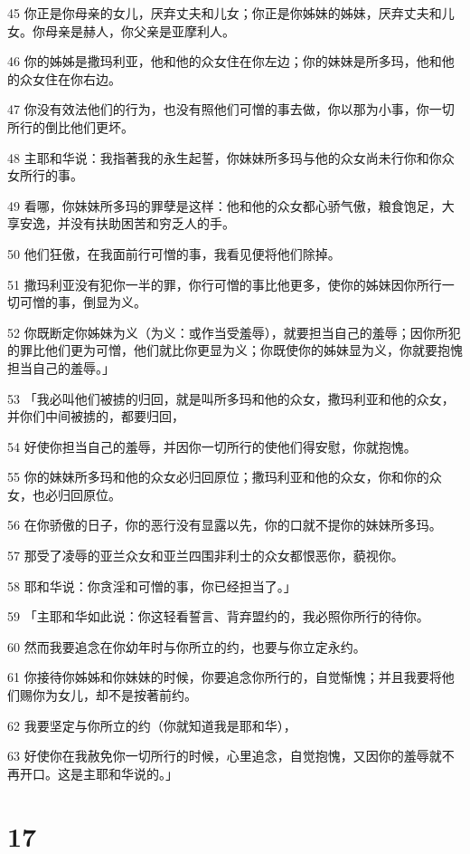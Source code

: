 \par 45 你正是你母亲的女儿，厌弃丈夫和儿女；你正是你姊妹的姊妹，厌弃丈夫和儿女。你母亲是赫人，你父亲是亚摩利人。
\par 46 你的姊姊是撒玛利亚，他和他的众女住在你左边；你的妹妹是所多玛，他和他的众女住在你右边。
\par 47 你没有效法他们的行为，也没有照他们可憎的事去做，你以那为小事，你一切所行的倒比他们更坏。
\par 48 主耶和华说：我指著我的永生起誓，你妹妹所多玛与他的众女尚未行你和你众女所行的事。
\par 49 看哪，你妹妹所多玛的罪孽是这样：他和他的众女都心骄气傲，粮食饱足，大享安逸，并没有扶助困苦和穷乏人的手。
\par 50 他们狂傲，在我面前行可憎的事，我看见便将他们除掉。
\par 51 撒玛利亚没有犯你一半的罪，你行可憎的事比他更多，使你的姊妹因你所行一切可憎的事，倒显为义。
\par 52 你既断定你姊妹为义（为义：或作当受羞辱），就要担当自己的羞辱；因你所犯的罪比他们更为可憎，他们就比你更显为义；你既使你的姊妹显为义，你就要抱愧担当自己的羞辱。」
\par 53 「我必叫他们被掳的归回，就是叫所多玛和他的众女，撒玛利亚和他的众女，并你们中间被掳的，都要归回，
\par 54 好使你担当自己的羞辱，并因你一切所行的使他们得安慰，你就抱愧。
\par 55 你的妹妹所多玛和他的众女必归回原位；撒玛利亚和他的众女，你和你的众女，也必归回原位。
\par 56 在你骄傲的日子，你的恶行没有显露以先，你的口就不提你的妹妹所多玛。
\par 57 那受了凌辱的亚兰众女和亚兰四围非利士的众女都恨恶你，藐视你。
\par 58 耶和华说：你贪淫和可憎的事，你已经担当了。」
\par 59 「主耶和华如此说：你这轻看誓言、背弃盟约的，我必照你所行的待你。
\par 60 然而我要追念在你幼年时与你所立的约，也要与你立定永约。
\par 61 你接待你姊姊和你妹妹的时候，你要追念你所行的，自觉惭愧；并且我要将他们赐你为女儿，却不是按著前约。
\par 62 我要坚定与你所立的约（你就知道我是耶和华），
\par 63 好使你在我赦免你一切所行的时候，心里追念，自觉抱愧，又因你的羞辱就不再开口。这是主耶和华说的。」

\chapter{17}

